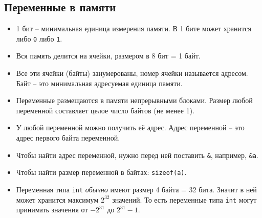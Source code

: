 \documentclass{article}
\begin{document}
\subsection*{Переменные в памяти}
\begin{itemize}
\item 1 бит -- минимальная единица измерения памяти. В 1 бите может хранится либо \texttt{0} либо \texttt{1}.
\item Вся память делится на ячейки, размером в 8 бит = 1 байт.
\item Все эти ячейки (байты) занумерованы, номер ячейки называется адресом. Байт -- это минимальная адресуемая единица памяти.
\item Переменные размещаются в памяти непрерывными блоками. Размер любой переменной составляет целое число байтов (не менее 1).
\item У любой переменной можно получить её адрес. Адрес переменной -- это адрес первого байта переменной.
\item Чтобы найти адрес переменной, нужно перед ней поставить \texttt{\&}, например, \texttt{\&a}.
\item Чтобы найти размер переменной в байтах: \texttt{sizeof(a)}.
\item Переменная типа \texttt{int} \textit{обычно} имеют размер 4 байта = 32 бита. Значит в ней может хранится максимум $2^{32}$ значений. То есть переменные типа \texttt{int} могут принимать значения от $-2^{31}$ до $2^{31} - 1$.
\end{itemize}
\end{document}

